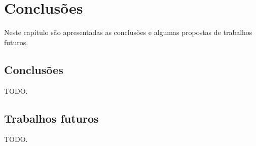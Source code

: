 \chapter{Conclusões \label{cap:conclusoes}}

Neste capítulo são apresentadas as conclusões e algumas propostas de
trabalhos futuros.

\section{Conclusões}

    TODO.

\section{Trabalhos futuros}

    TODO.
